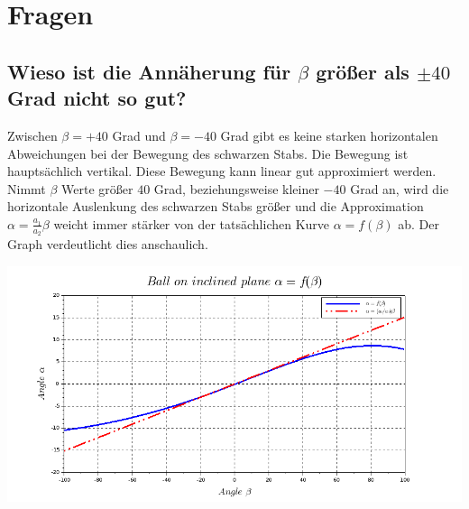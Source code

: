 \section{Fragen}
\subsection{Wieso ist die Annäherung für $\beta$ größer als $\pm40$ Grad nicht so gut?}
Zwischen $\beta=+40$ Grad und $\beta=-40$ Grad gibt es keine starken horizontalen Abweichungen bei der Bewegung des schwarzen Stabs. Die Bewegung ist hauptsächlich vertikal. Diese Bewegung kann linear gut approximiert werden. Nimmt $\beta$ Werte größer $40$ Grad, beziehungsweise kleiner $-40$ Grad an, wird die horizontale Auslenkung des schwarzen Stabs größer und die Approximation $\alpha=\frac{a_1}{a_2}\beta$ weicht immer stärker von der tatsächlichen Kurve $\alpha = f(\beta)$ ab. Der Graph verdeutlicht dies anschaulich.
\begin{center}
	\begin{minipage}{\linewidth}
		\centering
		\includegraphics[scale=0.45]{images/plot1_1.png}
	\end{minipage}
\end{center}


